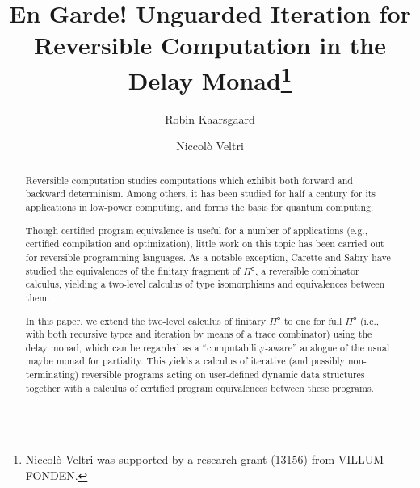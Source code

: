 \documentclass[runningheads,a4paper]{llncs}
\newcommand{\Pio}{\ensuremath{\mathsf{\Pi}^{\mathsf{o}}}}
\begin{document}
%
\title{En Garde! Unguarded Iteration for Reversible Computation in the
  Delay Monad\thanks{Niccol\`o Veltri was supported by a research
    grant (13156) from VILLUM FONDEN.}}
%
%
\author{Robin Kaarsgaard  \and
Niccol\`o Veltri}
%
%
%
\maketitle              %
%
\begin{abstract}
Reversible computation studies computations which exhibit both forward and
backward determinism. Among others, it has been studied for half a century for
its applications in low-power computing, and forms the basis for quantum
computing.

Though certified program equivalence is useful for a number of applications
(e.g., certified compilation and optimization), little work on this topic has
been carried out for reversible programming languages. As a notable exception,
Carette and Sabry have studied the equivalences of the finitary fragment of \Pio, a reversible combinator calculus, yielding a two-level calculus of type isomorphisms and equivalences between them.

In this paper, we extend the two-level calculus of finitary \Pio{} to one for
full \Pio{} (i.e., with both recursive types and iteration by means of a
trace combinator) using the delay monad, which can be regarded as a
``computability-aware'' analogue of the usual maybe monad for
partiality. This yields a calculus of iterative (and possibly non-terminating)
reversible programs acting on user-defined dynamic data structures together
with a calculus of certified program equivalences between these programs.

\end{abstract}
\end{document}
